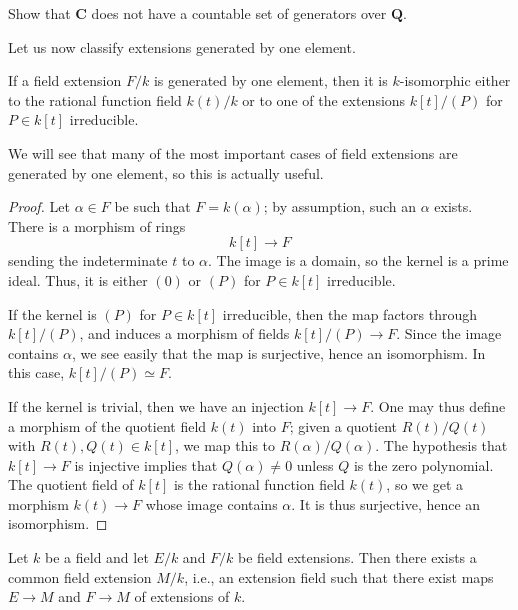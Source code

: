 \begin{exercise}
\label{exercise-C-not-countably-generated}
Show that $\mathbf{C}$ does not have a countable set of generators over
$\mathbf{Q}$.
\end{exercise}

\noindent
Let us now classify extensions generated by one element.

\begin{lemma}
\label{lemma-field-extension-generated-by-one-element}
If a field extension $F/k$ is generated by one element, then it is
$k$-isomorphic either to the rational function field $k(t)/k$ or to one
of the extensions $k[t]/(P)$ for $P \in k[t]$ irreducible.
\end{lemma}

\noindent
We will see that many of the most important cases of field extensions are
generated by one element, so this is actually useful.

\begin{proof}
Let $\alpha \in F$ be such that $F = k(\alpha)$; by assumption, such an
$\alpha$ exists. There is a morphism of rings
$$
k[t] \to F
$$
sending the indeterminate $t$ to $\alpha$. The image is a domain, so the
kernel is a prime ideal. Thus, it is either $(0)$ or $(P)$ for $P \in k[t]$
irreducible.

\medskip\noindent
If the kernel is $(P)$ for $P \in k[t]$ irreducible, then the map factors
through $k[t]/(P)$, and induces a morphism of fields $k[t]/(P) \to F$. Since
the image contains $\alpha$, we see easily that the map is surjective, hence
an isomorphism. In this case, $k[t]/(P) \simeq F$.

\medskip\noindent
If the kernel is trivial, then we have an injection $k[t] \to F$.
One may thus define a morphism of the quotient field $k(t)$ into $F$; given a
quotient $R(t)/Q(t)$ with $R(t), Q(t) \in k[t]$, we map this to
$R(\alpha)/Q(\alpha)$. The hypothesis that $k[t] \to F$ is injective implies
that $Q(\alpha) \neq 0$ unless $Q$ is the zero polynomial.
The quotient field of $k[t]$ is the rational function field $k(t)$, so we get
a morphism $k(t) \to F$
whose image contains $\alpha$. It is thus surjective, hence an isomorphism.
\end{proof}

\begin{lemma}
\label{lemma-common-extension-field}
Let $k$ be a field and let $E/k$ and $F/k$ be field extensions.
Then there exists a common field extension $M/k$, i.e., an extension
field such that there exist maps $E \to M$ and $F \to M$ of extensions of $k$.
\end{lemma}

